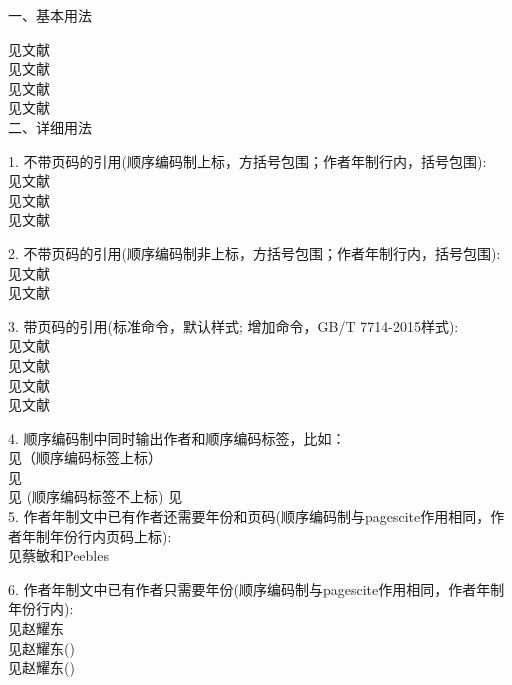 \documentclass{article}%
\begin{document}


一、基本用法

见文献\cite{Peebles2001-100-100}\\
见文献\parencite{Peebles2001-100-100}\\
见文献\citet{Peebles2001-100-100}\\
见文献\citep{Peebles2001-100-100}\\

二、详细用法

1. 不带页码的引用(顺序编码制上标，方括号包围；作者年制行内，括号包围):\\
	见文献\cite{Peebles2001-100-100}\\
	见文献\\
	见文献\supercite{Peebles2001-100-100}

2. 不带页码的引用(顺序编码制非上标，方括号包围；作者年制行内，括号包围):\\
	见文献\parencite{Peebles2001-100-100}\\
	见文献\citep{Peebles2001-100-100}

3. 带页码的引用(标准命令，默认样式; 增加命令，GB/T 7714-2015样式):\\
	见文献\cite[见][49页]{蔡敏2006--}\\
	见文献\parencite[见][49页]{Peebles2001-100-100}\\
	见文献\\
	见文献

4. 顺序编码制中同时输出作者和顺序编码标签，比如：\\
	见\citet{蔡敏2006--}（顺序编码标签上标）\\
	见\\
	见\textcite{蔡敏2006--} (顺序编码标签不上标)
	见\citeauthor{蔡敏2006--}\cite{蔡敏2006--}\\

5. 作者年制文中已有作者还需要年份和页码(顺序编码制与pagescite作用相同，作者年制年份行内页码上标):\\
	见蔡敏和Peebles

6. 作者年制文中已有作者只需要年份(顺序编码制与pagescite作用相同，作者年制年份行内):\\
	见赵耀东\\
	见赵耀东(\cite*{蔡敏2006--})\\
	见赵耀东(\citeyear{蔡敏2006--})
\end{document}
